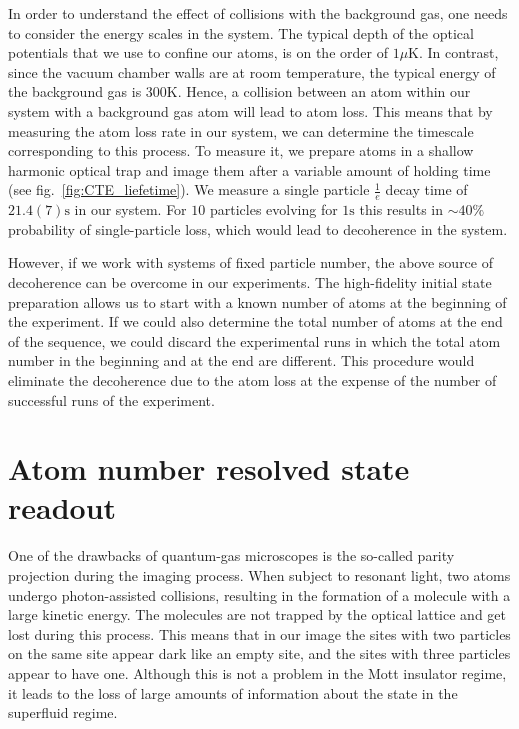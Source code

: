 In order to understand the effect of collisions with the background gas, one needs to consider the energy scales in the system. The typical depth of the optical potentials that we use to confine our atoms, is on the order of $1 \mu \textrm{K}$. In contrast, since the vacuum chamber walls are at room temperature, the typical energy of the background gas is $300 \textrm{K}$. Hence, a collision between an atom within our system with a background gas atom will lead to atom loss. This means that by measuring the atom loss rate in our system, we can determine the timescale corresponding to this process. To measure it, we prepare atoms in a shallow harmonic optical trap and image them after a variable amount of holding time (see fig.~\ref{fig:CTE_liefetime}). We measure a single particle $\frac{1}{e}$ decay time of $21.4(7)\textrm{s}$ in our system. For $10$ particles  evolving for $1\textrm{s}$ this results in $\sim 40\%$ probability of single-particle loss, which would lead to decoherence in the system.

However, if we work with systems of fixed particle number, the above source of decoherence can be overcome in our experiments. The high-fidelity initial state preparation allows us to start with a known number of atoms at the beginning of the experiment. If we could also determine the total number of atoms at the end of the sequence, we could discard the experimental runs in which the total atom number in the beginning and at the end are different. This procedure would eliminate the decoherence due to the atom loss at the expense of the number of successful runs of the experiment.

\section{Atom number resolved state readout}
One of the drawbacks of quantum-gas microscopes is the so-called parity projection during the imaging process. When subject to resonant light, two atoms undergo photon-assisted collisions, resulting in the formation of a molecule with a large kinetic energy. The molecules are not trapped by the optical lattice and get lost during this process. This means that in our image the sites with two particles on the same site appear dark like an empty site, and the sites with three particles appear to have one. Although this is not a problem in the Mott insulator regime, it leads to the loss of large amounts of information about the state in the superfluid regime. 

